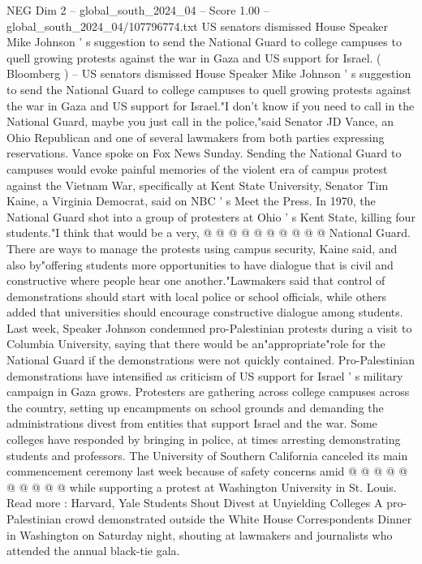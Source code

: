 \begin{textsample}{NEG Dim 2 – global\_south\_2024\_04 – Score 1.00 – global\_south\_2024\_04/107796774.txt}  \label{ex:f2_neg_292}
US senators dismissed House Speaker Mike Johnson ' s suggestion to send the National Guard to college campuses to quell growing protests against the war in Gaza and US support for Israel. ( Bloomberg ) -- US senators dismissed House Speaker Mike Johnson ' s suggestion to send the National Guard to college campuses to quell growing protests against the war in Gaza and US support for Israel."I don't know if you need to call in the National Guard, maybe you just call in the police,"said Senator JD Vance, an Ohio Republican and one of several lawmakers from both parties expressing reservations.
Vance spoke on Fox News Sunday.
Sending the National Guard to campuses would evoke painful memories of the violent era of campus protest against the Vietnam War, specifically at Kent State University, Senator Tim Kaine, a Virginia Democrat, said on NBC ' s Meet the Press.
In 1970, the National Guard shot into a group of protesters at Ohio ' s Kent State, killing four students."I think that would be a very, @ @ @ @ @ @ @ @ @ @ National Guard.
There are ways to manage the protests using campus security, Kaine said, and also by"offering students more opportunities to have dialogue that is civil and constructive where people hear one another."Lawmakers said that control of demonstrations should start with local police or school officials, while others added that universities should encourage constructive dialogue among students.
Last week, Speaker Johnson condemned pro-Palestinian protests during a visit to Columbia University, saying that there would be an"appropriate"role for the National Guard if the demonstrations were not quickly contained.
Pro-Palestinian demonstrations have intensified as criticism of US support for Israel ' s military campaign in Gaza grows.
Protesters are gathering across college campuses across the country, setting up encampments on school grounds and demanding the administrations divest from entities that support Israel and the war.
Some colleges have responded by bringing in police, at times arresting demonstrating students and professors.
The University of Southern California canceled its main commencement ceremony last week because of safety concerns amid @ @ @ @ @ @ @ @ @ @ while supporting a protest at Washington University in St.
Louis.
Read more : Harvard, Yale Students Shout Divest at Unyielding Colleges A pro-Palestinian crowd demonstrated outside the White House Correspondents Dinner in Washington on Saturday night, shouting at lawmakers and journalists who attended the annual black-tie gala.

\end{textsample}
